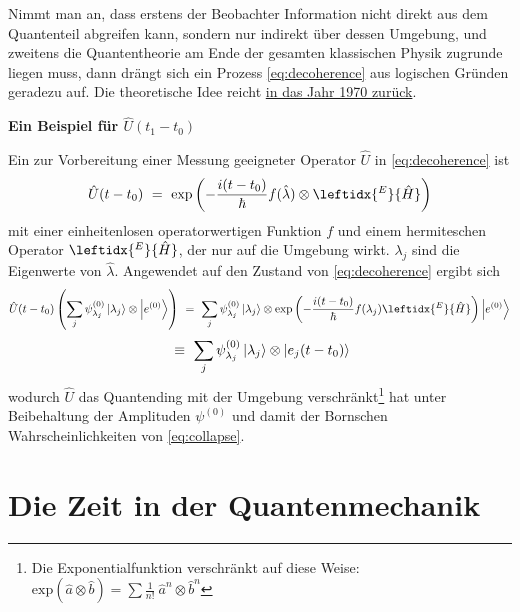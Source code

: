 \documentclass[12pt]{article}
\begin{document}
Nimmt man an, dass erstens der Beobachter Information nicht direkt aus dem Quantenteil abgreifen kann, sondern nur indirekt über dessen Umgebung, und zweitens die Quantentheorie am Ende der gesamten klassischen Physik zugrunde liegen muss, dann drängt sich ein Prozess \eqref{eq:decoherence} aus logischen Gründen geradezu auf. Die theoretische Idee reicht \href{https://de.wikipedia.org/wiki/Dieter_Zeh}{in das Jahr 1970 zurück}.
 
\textbf{Ein Beispiel für $\hat{U}(t_1-t_0)$}

Ein zur Vorbereitung einer Messung geeigneter Operator $\hat{U}$ in \eqref{eq:decoherence} ist
\begin{equation}
\label{eq:decoherence_measurement}
\hat{U}(t-t_0)\ =\ \mathrm{exp}\left(-\frac{i(t-t_0)}{\hbar}f(\hat{\lambda})\otimes \leftidx{^E}{\hat{H}}\right)
\end{equation}
mit einer einheitenlosen operatorwertigen Funktion $f$ und einem hermiteschen Operator $\leftidx{^E}{\hat{H}}$, der nur auf die Umgebung wirkt. $\lambda_j$ sind die Eigenwerte von $\hat{\lambda}$.
Angewendet auf den Zustand von \eqref{eq:decoherence} ergibt sich
\begin{equation*}
\hat{U}(t-t_0)\left(\sum_j \psi^{(0)}_{\lambda_j} \ket{\lambda_j}\otimes\ket{e^{(0)}}\right)
\ =\ \sum_j \psi^{(0)}_{\lambda_j} \ket{\lambda_j} 
\otimes \mathrm{exp}\left(-\frac{i(t-t_0)}{\hbar}f(\lambda_j)\leftidx{^E}{\hat{H}}\right)
\ket{e^{(0)}} 
\end{equation*}
\begin{equation}
\label{eq:entangled_environment}
\ \equiv\ 
\sum_j \psi^{(0)}_{\lambda_j} \ket{\lambda_j} 
\otimes \ket{e_j(t-t_0)} 
\end{equation}
wodurch $\hat{U}$ das Quantending mit der Umgebung verschränkt\footnote{Die Exponentialfunktion verschränkt auf diese Weise: $\mathrm{exp}(\hat{a}\otimes\hat{b})=\sum \frac{1}{n\mathrm{!}}\ \hat{a}^n\otimes\hat{b}^n$} hat unter Beibehaltung der Amplituden $\psi^{(0)}$ und damit der Bornschen Wahrscheinlichkeiten von \eqref{eq:collapse}.

\section{Die Zeit in der Quantenmechanik}
\end{document}
